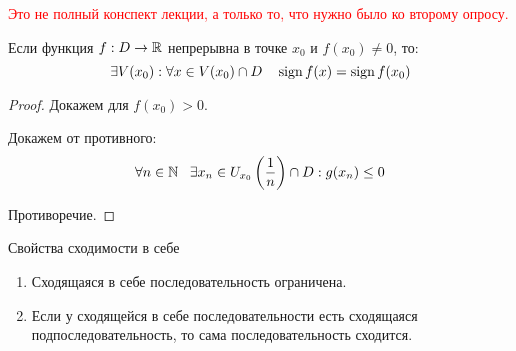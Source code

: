 

\usepackage{xcolor}

\cfoot{}


    \textcolor{red}{Это не полный конспект лекции, а только то, что нужно было ко второму опросу.}

    \begin{theorem}
        Если функция $f : D\to\operatorname*{\mathbb{R}}$ непрерывна в точке $x_0$ и $f(x_0)\not=0$, то:
        $$\exists V(x_0) : \forall x\in V(x_0)\cap D \quad \operatorname{\text{sign}} f(x) = \operatorname{\text{sign}} f(x_0)$$
    \end{theorem}
    \begin{proof}
        Докажем для $f(x_0)>0$.

        Докажем от противного: $$\forall n\in\N \ \ \exists x_n\in U_{x_0}\left(\frac{1}{n}\right)\cap D : g(x_n)\leq 0$$

        Противоречие.
    \end{proof}

    \begin{lemma}
        Свойства сходимости в себе

        \begin{enumerate}
            \item Сходящаяся в себе последовательность ограничена.
            \item Если у сходящейся в себе последовательности есть сходящаяся подпоследовательность, то сама последовательность сходится.
        \end{enumerate}
    \end{lemma}
